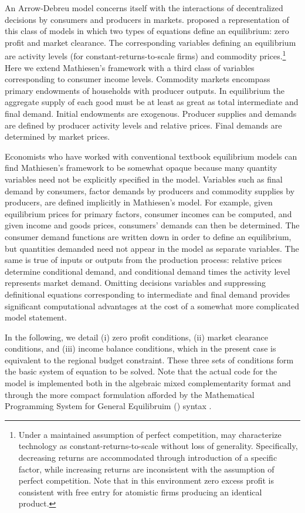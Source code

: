 An Arrow-Debreu model concerns itself with the interactions of
decentralized decisions by consumers and producers in markets.
\citet{Lars} proposed a representation of this class of models in
which two types of equations define an equilibrium: zero profit and
market clearance. The corresponding variables defining an equilibrium
are activity levels (for constant-returns-to-scale firms) and
commodity prices.\footnote{Under a maintained assumption of perfect
competition, \citet{Lars} may characterize technology as
constant-returns-to-scale without loss of generality. Specifically,
decreasing returns are accommodated through introduction of a specific
factor, while increasing returns are inconsistent with the assumption
of perfect competition. Note that in this environment zero excess
profit is consistent with free entry for atomistic firms producing an
identical product.} Here we extend Mathiesen's framework with a third
class of variables corresponding to consumer income levels. Commodity
markets encompass primary endowments of households with producer
outputs. In equilibrium the aggregate supply of each good must be at
least as great as total intermediate and final demand. Initial
endowments are exogenous. Producer supplies and demands are defined by
producer activity levels and relative prices. Final demands are
determined by market prices.

Economists who have worked with conventional textbook equilibrium
models can find Mathiesen's framework to be somewhat opaque because
many quantity variables need not be explicitly specified in the model.
Variables such as final demand by consumers, factor demands by
producers and commodity supplies by producers, are defined implicitly
in Mathiesen's model. For example, given equilibrium prices for
primary factors, consumer incomes can be computed, and given income
and goods prices, consumers' demands can then be determined. The
consumer demand functions are written down in order to define an
equilibrium, but quantities demanded need not appear in the model as
separate variables. The same is true of inputs or outputs from the
production process: relative prices determine conditional demand, and
conditional demand times the activity level represents market demand.
Omitting decisions variables and suppressing definitional equations
corresponding to intermediate and final demand provides significant
computational advantages at the cost of a somewhat more complicated
model statement.

In the following, we detail (i) zero profit conditions, (ii) market
clearance conditions, and (iii) income balance conditions, which in
the present case is equivalent to the regional budget constraint.
These three sets of conditions form the basic system of equation to be
solved. Note that the actual code for the model is implemented both in
the algebraic mixed complementarity format \citep[\GAMS/\MCP,
see][]{Rutherford1995} and through the more compact formulation
afforded by the Mathematical Programming System for General
Equilibruim (\MPSGE) syntax \citep{Rutherford1999}.

